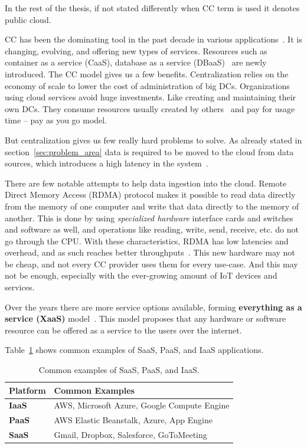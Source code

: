 In the rest of the thesis, if not stated differently when CC term is used it denotes public cloud.

CC has been the dominating tool in the past decade in various applications~\cite{Satyanarayanan17}. It is changing, evolving, and offering new types of services. Resources such as container as a service (CaaS), database as a service (DBaaS)~\cite{Peter} are newly introduced. The CC model gives us a few benefits. Centralization relies on the economy of scale to lower the cost of administration of big DCs. Organizations using cloud services avoid huge investments. Like creating and maintaining their own DCs. They consume resources usually created by others~\cite{Satyanarayanan17} and pay for usage time -- pay as you go model. 

But centralization gives us few really hard problems to solve. As already stated in section~\ref{sec:problem_area} data is required to be moved to the cloud from data sources, which introduces a high latency in the system~\cite{HossainRH18}. 

There are few notable attempts to help data ingestion into the cloud. Remote Direct Memory Access (RDMA) protocol makes it possible to read data directly from the memory of one computer and write that data directly to the memory of another. This is done by using \textit{specialized hardware} interface cards and switches and software as well, and operations like reading, write, send, receive, etc. do not go through the CPU. With these characteristics, RDMA has low latencies and overhead, and as such reaches better throughputs~\cite{CohenTKCKRCDG09}. This new hardware may not be cheap, and not every CC provider uses them for every use-case. And this may not be enough, especially with the ever-growing amount of IoT devices and services.

Over the years there are more service options available, forming \textbf{everything as a service (XaaS)} model~\cite{DuanFZSNH15}. This model proposes that any hardware or software resource can be offered as a service to the users over the internet.

Table~\ref{tab:table2} shows common examples of SaaS, PaaS, and IaaS applications.

\begin{table}[h!]
	\begin{center}
		\begin{tabular}{l|l}
			\textbf{Platform} & \textbf{Common Examples}\\
			\hline
			\textbf{IaaS} & AWS, Microsoft Azure, Google Compute Engine \\
			\textbf{PaaS} & AWS Elastic Beanstalk, Azure, App Engine \\
			\textbf{SaaS} & Gmail, Dropbox, Salesforce, GoToMeeting \\
		\end{tabular}
	\end{center}
	\vspace{-0.5cm}
	\caption{Common examples of SaaS, PaaS, and IaaS.}
	\label{tab:table2}
\end{table}

